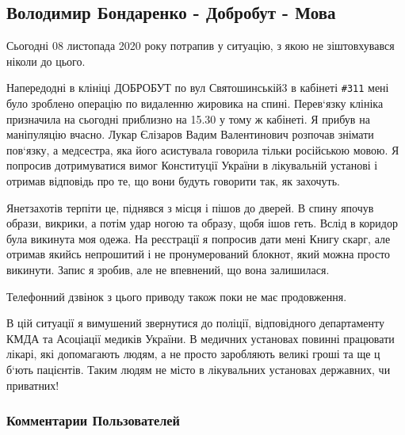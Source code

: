 
 
 

\subsection{Володимир Бондаренко - Добробут - Мова}

Сьогодні 08 листопада 2020 року потрапив у ситуацію, з якою не зіштовхувався ніколи до цього. 

Напередодні в клініці ДОБРОБУТ по вул Святошинській3  в кабінеті \verb|#311| мені було
зроблено операцію по видаленню жировика на спині. Перев‘язку клініка призначила
на сьогодні приблизно на 15.30 у тому ж кабінеті. Я прибув на маніпуляцію
вчасно. Лукар Єлізаров Вадим Валентинович розпочав знімати пов‘язку, а
медсестра, яка його асистувала говорила тільки російською мовою. Я попросив
дотримуватися вимог Конституції України в лікувальній установі і отримав
відповідь про те, що вони будуть говорити так, як захочуть.

Янетзахотів терпіти це, піднявся з місця і пішов до дверей. В спину япочув
образи, викрики, а потім удар ногою та образу, щобя ішов геть.  Вслід в коридор
була викинута моя одежа. На реєстрації я попросив дати мені Книгу скарг, але
отримав якийсь непрошитий і не пронумерований блокнот, який можна просто
викинути. Запис я зробив, але не впевнений, що вона залишилася. 

Телефонний дзвінок з цього приводу також поки не має продовження.

В цій ситуації я вимушений звернутися до поліції, відповідного департаменту
КМДА  та Асоціації медиків України.  В медичних установах повинні працювати
лікарі, які допомагають людям, а не просто заробляють великі гроші та ще ц
б‘ють пацієнтів. Таким людям не місто в лікувальних установах державних, чи
приватних!

\subsubsection{Комментарии Пользователей}

